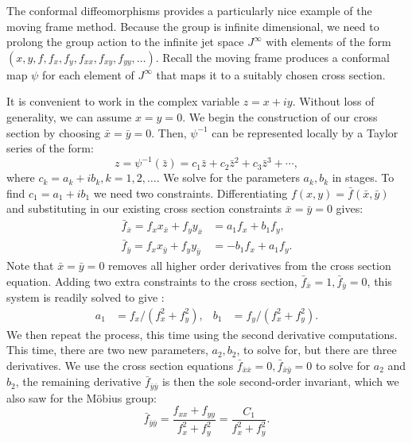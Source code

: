 \documentclass[review,onefignum,onetabnum]{siamonline190516}
\begin{document}
The conformal diffeomorphisms provides a particularly nice example of the
moving frame method. Because the group is infinite dimensional, we need to
prolong the group action to the infinite jet space $J^{\infty}$ with
elements of the form $(x, y, f, f_x, f_y, f_{xx}, f_{xy}, f_{yy}, \ldots)$.
Recall the moving frame produces a conformal map $\psi$ for each element of
$J^\infty$ that maps it to a suitably chosen cross section. 

It is convenient to work in the complex variable $z = x + iy$. Without loss of
generality, we can assume $x = y = 0$. We begin the construction of our
cross section by choosing $\bar{x} = \bar{y} = 0$. Then, $\psi^{-1}$ 
can be represented locally by a Taylor series of the form:
\begin{equation*}
    z = \psi^{-1}(\bar{z}) = c_1 \bar{z} + c_2 \bar{z}^2 + c_3\bar{z}^3 + \cdots,
\end{equation*}
where $c_k = a_k + ib_k, k = 1, 2, \ldots$. We solve for the parameters
$a_k, b_k$ in stages.  To find $c_1 = a_1 + i b_1$ we need two constraints.
Differentiating $f(x, y) = \bar{f}(\bar{x}, \bar{y})$ and substituting in
our existing cross section constraints $\bar{x} = \bar{y} = 0$ gives:
\begin{align*}
    \bar{f}_{\bar{x}} = f_x x_{\bar{x}} + f_y y_{\bar{x}} &= a_1 f_x + b_1
    f_y, \\
    \bar{f}_{\bar{y}} = f_x x_{\bar{y}} + f_y y_{\bar{y}} &= -b_1 f_x + a_1
    f_y. 
\end{align*}
Note that $\bar{x} = \bar{y} = 0$ removes all higher order derivatives from
the cross section equation. Adding two extra constraints to the cross
section, $\bar{f}_{\bar{x}} = 1, \bar{f}_{\bar{y}} = 0$, this system is readily
solved to give :
\begin{equation*}
    \begin{aligned}
        a_1 &= f_x / (f_x^2 + f_y^2), &  b_1 &= f_y / (f_x^2 + f_y^2).
    \end{aligned}
\end{equation*}
We then repeat the process, this time using the second derivative
computations. This time, there are two new parameters, $a_2, b_2$, to solve
for, but there are three derivatives. We use the cross section equations
$\bar{f}_{\bar{x}\bar{x}} = 0, \bar{f}_{\bar{x}\bar{y}} = 0$ to solve for
$a_2$ and $b_2$, the remaining derivative $\bar{f}_{\bar{y}\bar{y}}$ is then the
sole second-order invariant, which we also saw for the M\"obius group: 
\begin{equation}
    \bar{f}_{\bar{y}\bar{y}} = \frac{f_{xx} + f_{yy}}{f_x^2 + f_y^2} =
    \frac{C_1}{f_x^2 + f_y^2}.
\label{eqn:C1}
\end{equation}
\end{document}
